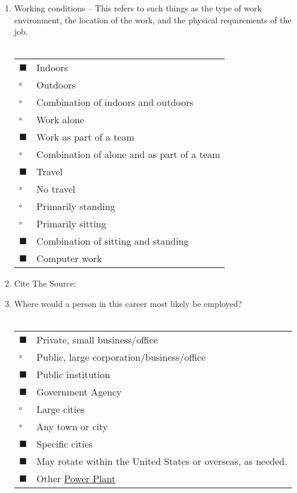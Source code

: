 \documentclass{article}
\begin{document}
\begin{enumerate}
    \item Working conditions – This refers to such things as the type of work environment, the location of the work, and the physical requirements of the job.\\\\
    \vspace{5pt}
    \vspace{5pt}
    \begin{tabular}{l l}
    $\blacksquare$ & Indoors\\
    $\square$ & Outdoors\\
    $\square$ & Combination of indoors and outdoors\\
    $\square$ & Work alone\\
    $\blacksquare$ & Work as part of a team\\
    $\square$ & Combination of alone and as part of a team\\
    $\blacksquare$ & Travel\\
    $\square$ & No travel\\
    $\square$ & Primarily standing\\
    $\square$ & Primarily sitting\\
    $\blacksquare$ & Combination of sitting and standing\\
    $\blacksquare$ & Computer work\\
    
   
    
\end{tabular}

    \item Cite The Source: \\
        \vspace{5pt}
        \cite{workNature:1}

    \item Where would a person in this career most likely be employed?\\\\
    \vspace{5pt}
    \vspace{5pt}
    \begin{tabular}{l l}
    $\blacksquare$ & Private, small business/office\\
    $\square$ & Public, large corporation/business/office\\
    $\blacksquare$ & Public institution\\
    $\blacksquare$ & Government Agency\\
    $\square$ & Large cities\\
    $\square$ & Any town or city\\
    $\blacksquare$ & Specific cities\\
    $\blacksquare$ & May rotate within the United States or overseas, as needed.\\
    $\blacksquare$ & Other \underline{Power Plant}\\
    

\end{tabular}
\end{enumerate}
\end{document}
